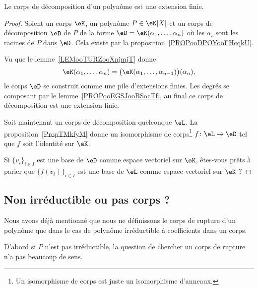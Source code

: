 \begin{corollary}    \label{CORooELAUooPQGLkR}
    Le corps de décomposition d'un polynôme est une extension finie.
\end{corollary}

\begin{proof}
    Soient un corps \( \eK\), un polynôme \( P\in \eK[X]\) et un corps de décomposition \( \eD\) de \( P\) de la forme \( \eD=\eK(\alpha_1,\ldots, \alpha_n)\) où les \( \alpha_i\) sont les racines de \( P\) dans \( \eD\). Cela existe par la proposition~\ref{PROPooDPOYooFHcqkU}.

    Vu que le lemme~\ref{LEMooTURZooXnjmjT} donne
    \begin{equation}
        \eK(\alpha_1,\ldots, \alpha_n)=\big( \eK(\alpha_1,\ldots, \alpha_{n-1}) \big)(\alpha_n),
    \end{equation}
    le corps \( \eD\) se construit comme une pile d'extensions finies. Les degrés se composant par le lemme~\ref{PROPooEGSJooBSocTf}, au final ce corps de décomposition est une extension finie.

    Soit maintenant un corps de décomposition quelconque \( \eL\). La proposition~\ref{PropTMkfyM} donne un isomorphisme de corps\footnote{Un isomorphisme de corps est juste un isomorphisme d'anneaux.} \( f\colon \eL\to \eD\) tel que \( f\) soit l'identité sur \( \eK\).

    Si \( \{ v_i \}_{i\in I}\) est une base de \( \eD\) comme espace vectoriel sur \( \eK\), êtes-vous prêts à parier que \( \{ f(v_i) \}_{i\in I}\) est une base de \( \eL\) comme espace vectoriel sur \( \eK\) ?
\end{proof}

\subsection{Non irréductible ou pas corps ?}
\label{SUBSECooEDMJooTXBfOu}

Nous avons déjà mentionné que nous ne définissons le corps de rupture d'un polynôme que dans le cas de polynôme irréductible à coefficients dans un corps.

D'abord si \( P\) n'est pas irréductible, la question de chercher un corps de rupture n'a pas beaucoup de sens.

